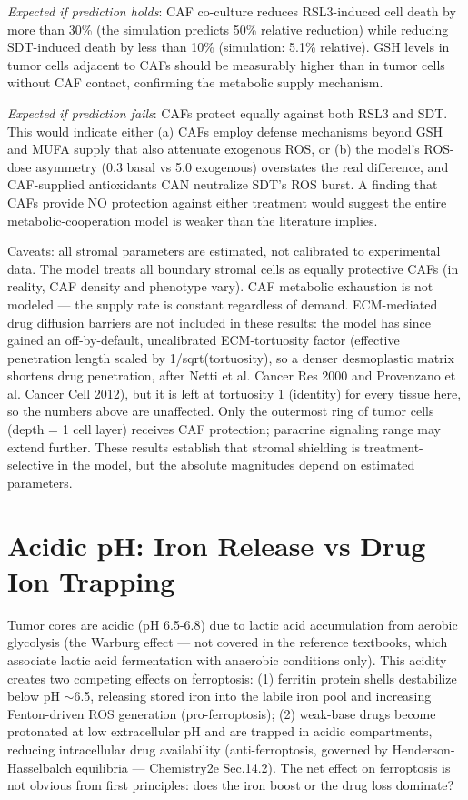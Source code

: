 \documentclass[11pt,twoside,openright]{report}
\begin{document}
\textit{Expected if prediction holds}: CAF co-culture reduces RSL3-induced cell death by more than 30\% (the simulation predicts 50\% relative reduction) while reducing SDT-induced death by less than 10\% (simulation: 5.1\% relative). GSH levels in tumor cells adjacent to CAFs should be measurably higher than in tumor cells without CAF contact, confirming the metabolic supply mechanism.

\textit{Expected if prediction fails}: CAFs protect equally against both RSL3 and SDT. This would indicate either (a) CAFs employ defense mechanisms beyond GSH and MUFA supply that also attenuate exogenous ROS, or (b) the model's ROS-dose asymmetry (0.3 basal vs 5.0 exogenous) overstates the real difference, and CAF-supplied antioxidants CAN neutralize SDT's ROS burst. A finding that CAFs provide NO protection against either treatment would suggest the entire metabolic-cooperation model is weaker than the literature implies.

Caveats: all stromal parameters are estimated, not calibrated to experimental data. The model treats all boundary stromal cells as equally protective CAFs (in reality, CAF density and phenotype vary). CAF metabolic exhaustion is not modeled --- the supply rate is constant regardless of demand. ECM-mediated drug diffusion barriers are not included in these results: the  model has since gained an off-by-default, uncalibrated ECM-tortuosity factor (effective penetration length scaled by 1/sqrt(tortuosity), so a denser desmoplastic matrix shortens drug penetration, after Netti et al. Cancer Res 2000 and Provenzano et al. Cancer Cell 2012), but it is left at tortuosity 1 (identity) for every tissue here, so the numbers above are unaffected. Only the outermost ring of tumor cells (depth = 1 cell layer) receives CAF protection; paracrine signaling range may extend further. These results establish that stromal shielding is treatment-selective in the model, but the absolute magnitudes depend on estimated parameters.

\section{Acidic pH: Iron Release vs Drug Ion Trapping}

Tumor cores are acidic (pH 6.5-6.8) due to lactic acid accumulation from aerobic glycolysis (the Warburg effect --- not covered in the reference textbooks, which associate lactic acid fermentation with anaerobic conditions only). This acidity creates two competing effects on ferroptosis: (1) ferritin protein shells destabilize below pH $\sim$6.5, releasing stored iron into the labile iron pool and increasing Fenton-driven ROS generation (pro-ferroptosis); (2) weak-base drugs become protonated at low extracellular pH and are trapped in acidic compartments, reducing intracellular drug availability (anti-ferroptosis, governed by Henderson-Hasselbalch equilibria --- Chemistry2e Sec.14.2). The net effect on ferroptosis is not obvious from first principles: does the iron boost or the drug loss dominate?
\end{document}
